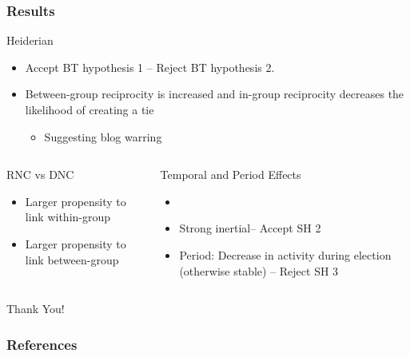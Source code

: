 \documentclass{beamer}
\begin{document}
\begin{frame}
\frametitle{Results}

\begin{block}{Heiderian}

\begin{itemize}
\item Accept BT hypothesis 1 --  Reject BT hypothesis 2.

\item Between-group reciprocity is increased and in-group reciprocity decreases the likelihood of creating a tie

\begin{itemize}
\item Suggesting blog warring
\end{itemize}

\end{itemize}

\end{block}

\begin{columns}


\begin{block}{RNC vs DNC}
\begin{itemize}
\item Larger propensity to link within-group
\item Larger propensity to link between-group 
\end{itemize}
\end{block}



\begin{block}{Temporal and Period Effects}
\begin{itemize}
\item 
\item Strong inertial-- Accept SH 2
\item Period: Decrease in activity during election (otherwise stable) -- Reject SH 3
\end{itemize}
\end{block}

\end{columns}


\end{frame}




\begin{frame}
\begin{block}{}
\begin{center}
Thank You!
\end{center}
\end{block}
\end{frame}

\begin{frame}[allowframebreaks] 
\frametitle{References}
\def\newblock{}


\end{frame}
\end{document}
